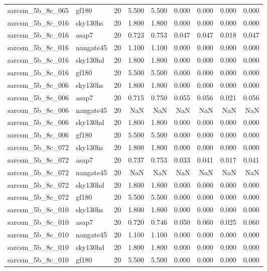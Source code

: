 \begin{tabular}{llrrrrrrr}
sarcsm\_5b\_8c\_065 & gf180 & 20 & 5.500 & 5.500 & 0.000 & 0.000 & 0.000 & 0.000 \\
sarcsm\_5b\_8c\_016 & sky130hs & 20 & 1.800 & 1.800 & 0.000 & 0.000 & 0.000 & 0.000 \\
sarcsm\_5b\_8c\_016 & asap7 & 20 & 0.723 & 0.753 & 0.047 & 0.047 & 0.018 & 0.047 \\
sarcsm\_5b\_8c\_016 & nangate45 & 20 & 1.100 & 1.100 & 0.000 & 0.000 & 0.000 & 0.000 \\
sarcsm\_5b\_8c\_016 & sky130hd & 20 & 1.800 & 1.800 & 0.000 & 0.000 & 0.000 & 0.000 \\
sarcsm\_5b\_8c\_016 & gf180 & 20 & 5.500 & 5.500 & 0.000 & 0.000 & 0.000 & 0.000 \\
sarcsm\_5b\_8c\_006 & sky130hs & 20 & 1.800 & 1.800 & 0.000 & 0.000 & 0.000 & 0.000 \\
sarcsm\_5b\_8c\_006 & asap7 & 20 & 0.715 & 0.750 & 0.055 & 0.056 & 0.021 & 0.056 \\
sarcsm\_5b\_8c\_006 & nangate45 & 20 & NaN & NaN & NaN & NaN & NaN & NaN \\
sarcsm\_5b\_8c\_006 & sky130hd & 20 & 1.800 & 1.800 & 0.000 & 0.000 & 0.000 & 0.000 \\
sarcsm\_5b\_8c\_006 & gf180 & 20 & 5.500 & 5.500 & 0.000 & 0.000 & 0.000 & 0.000 \\
sarcsm\_5b\_8c\_072 & sky130hs & 20 & 1.800 & 1.800 & 0.000 & 0.000 & 0.000 & 0.000 \\
sarcsm\_5b\_8c\_072 & asap7 & 20 & 0.737 & 0.753 & 0.033 & 0.041 & 0.017 & 0.041 \\
sarcsm\_5b\_8c\_072 & nangate45 & 20 & NaN & NaN & NaN & NaN & NaN & NaN \\
sarcsm\_5b\_8c\_072 & sky130hd & 20 & 1.800 & 1.800 & 0.000 & 0.000 & 0.000 & 0.000 \\
sarcsm\_5b\_8c\_072 & gf180 & 20 & 5.500 & 5.500 & 0.000 & 0.000 & 0.000 & 0.000 \\
sarcsm\_5b\_8c\_010 & sky130hs & 20 & 1.800 & 1.800 & 0.000 & 0.000 & 0.000 & 0.000 \\
sarcsm\_5b\_8c\_010 & asap7 & 20 & 0.720 & 0.746 & 0.050 & 0.060 & 0.025 & 0.060 \\
sarcsm\_5b\_8c\_010 & nangate45 & 20 & 1.100 & 1.100 & 0.000 & 0.000 & 0.000 & 0.000 \\
sarcsm\_5b\_8c\_010 & sky130hd & 20 & 1.800 & 1.800 & 0.000 & 0.000 & 0.000 & 0.000 \\
sarcsm\_5b\_8c\_010 & gf180 & 20 & 5.500 & 5.500 & 0.000 & 0.000 & 0.000 & 0.000 \\

\end{tabular}
